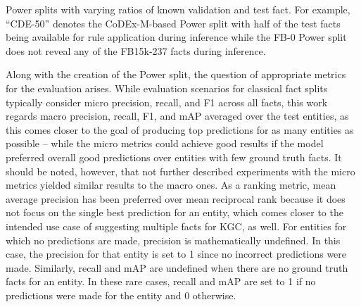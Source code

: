 \begin{table}[t]
    \centering
    
    \caption{Power splits with varying ratios of known validation and test fact. For example, ``CDE-50'' denotes the CoDEx-M-based Power split with half of the test facts being available for rule application during inference while the FB-0 Power split does not reveal any of the FB15k-237 facts during inference.}
    \label{tab:5_experiments/2_power_splits/power_splits_table}
\end{table}

Along with the creation of the Power split, the question of appropriate metrics for the evaluation arises. While evaluation scenarios for classical fact splits typically consider micro precision, recall, and F1 across all facts, this work regards macro precision, recall, F1, and mAP averaged over the test entities, as this comes closer to the goal of producing top predictions for as many entities as possible -- while the micro metrics could achieve good results if the model preferred overall good predictions over entities with few ground truth facts. It should be noted, however, that not further described experiments with the micro metrics yielded similar results to the macro ones. As a ranking metric, mean average precision has been preferred over mean reciprocal rank because it does not focus on the single best prediction for an entity, which comes closer to the intended use case of suggesting multiple facts for KGC, as well. For entities for which no predictions are made, precision is mathematically undefined. In this case, the precision for that entity is set to 1 since no incorrect predictions were made. Similarly, recall and mAP are undefined when there are no ground truth facts for an entity. In these rare cases, recall and mAP are set to 1 if no predictions were made for the entity and 0 otherwise.
